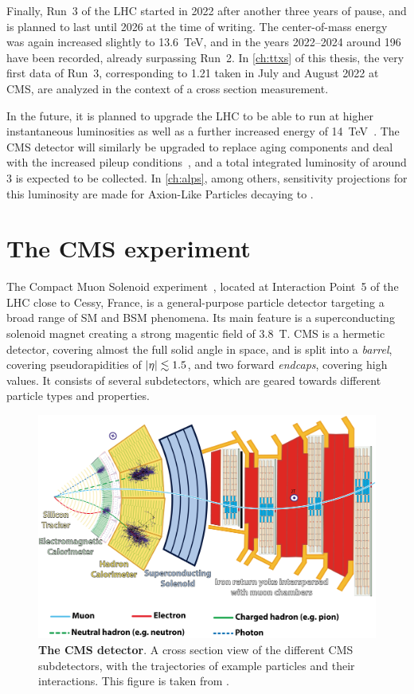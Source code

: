 Finally, Run~3 of the LHC started in 2022 after another three years of pause, and is planned to last until 2026 at the time of writing. The center-of-mass energy was again increased slightly to 13.6~TeV, and in the years 2022--2024 around \SI{196}{\fbinv} have been recorded, already surpassing Run~2. In \cref{ch:ttxs} of this thesis, the very first data of Run~3, corresponding to \SI{1.21}{\fbinv} taken in July and August 2022 at CMS, are analyzed in the context of a \ttbar cross section measurement. 

In the future, it is planned to upgrade the LHC to be able to run at higher instantaneous luminosities as well as a further increased energy of 14~TeV~\cite{ZurbanoFernandez:2020cco}. The CMS detector will similarly be upgraded to replace aging components and deal with the increased pileup conditions~\cite{CMS:TDR-15-02,CMS:PRF-21-001}, and a total integrated luminosity of around \SI{3}{\abinv} is expected to be collected. In \cref{ch:alps}, among others, sensitivity projections for this luminosity are made for Axion-Like Particles decaying to \ttbar.

\section{The CMS experiment}
\label{sec:methods:cms}

The Compact Muon Solenoid experiment~\cite{CMS:2008xjf,CMS:PRF-21-001}, located at Interaction Point~5 of the LHC close to Cessy, France, is a general-purpose particle detector targeting a broad range of SM and BSM phenomena. Its main feature is a superconducting solenoid magnet creating a strong magentic field of 3.8~T. CMS is a hermetic detector, covering almost the full solid angle in space, and is split into a \textit{barrel}, covering pseudorapidities of $|\eta| \lesssim 1.5$, and two forward \textit{endcaps}, covering high \abseta values. It consists of several subdetectors, which are geared towards different particle types and properties.

\begin{figure}
    \centering
    \includegraphics[width=\textwidth]{figures/cms_slice.png}
    \caption{\textbf{The CMS detector}. A cross section view of the different CMS subdetectors, with the trajectories of example particles and their interactions. This figure is taken from .}
\end{figure}

